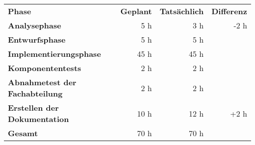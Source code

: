 \begin{tabular}{lrrr}
\rowcolor{heading}\textbf{Phase} & \textbf{Geplant} & \textbf{Tatsächlich} & \textbf{Differenz} \\
\textbf{Analysephase} & 5 h   & 3 h  & -2 h \\
\rowcolor{odd}\textbf{Entwurfsphase} & 5 h  & 5 h  &  \\
\textbf{Implementierungsphase} & 45 h  & 45 h  &  \\
\rowcolor{odd}\textbf{Komponententests} & 2 h   & 2 h   &  \\
\textbf{Abnahmetest der Fachabteilung} & 2 h   & 2 h   &  \\
\rowcolor{odd}\textbf{Erstellen der Dokumentation} & 10 h   & 12 h  & +2 h \\
\hline
\hline
\rowcolor{odd}\textbf{Gesamt} & 70 h  & 70 h  &  \\
\end{tabular}
